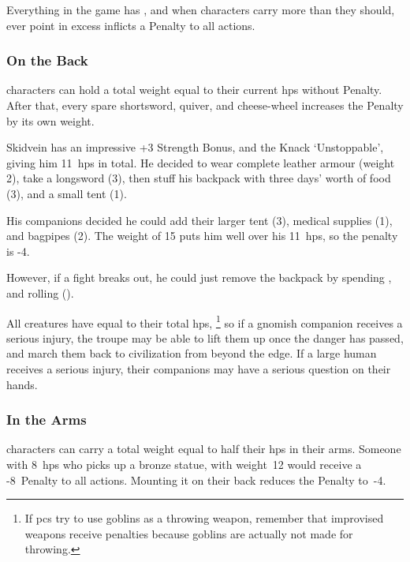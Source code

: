 \begin{multicols}{2}

\noindent%
Everything in the game has , and when characters carry more than they should, ever point in excess inflicts a Penalty to all actions.


\subsubsection{On the Back}
characters can hold a total \gls{weight} equal to their current \glspl{hp} without Penalty.
After that, every spare shortsword, quiver, and cheese-wheel increases the Penalty by its own \gls{weight}.

\begin{exampletext}
  Skidvein has an impressive +3 Strength Bonus, and the Knack `Unstoppable', giving him 11~\glspl{hp} in total.
  He decided to wear complete leather armour (\gls{weight} 2), take a longsword (3), then stuff his backpack with three days' worth of food (3), and a small tent (1).

  His companions decided he could add their larger tent (3), medical supplies (1), and bagpipes (2).
  The \gls{weight} of 15 puts him well over his 11~\glspl{hp}, so the penalty is -4.

  However, if a fight breaks out, he could just remove the backpack by spending , and rolling  (\tn[10]).
\end{exampletext}

All creatures have  equal to their total \glspl{hp},%
\footnote{If \glspl{pc} try to use goblins as a throwing weapon, remember that improvised weapons receive penalties because goblins are actually not made for throwing.}
so if a gnomish companion receives a serious injury, the troupe may be able to lift them up once the danger has passed, and march them back to civilization from beyond the \gls{edge}.
If a large human receives a serious injury, their companions may have a serious question on their hands.

\subsubsection{In the Arms}
characters can carry a total \gls{weight} equal to half their \glspl{hp} in their arms.
Someone with 8~\glspl{hp} who picks up a bronze statue, with \gls{weight}~12 would receive a -8~Penalty to all actions.
Mounting it on their back reduces the Penalty to~-4.


\end{multicols}
